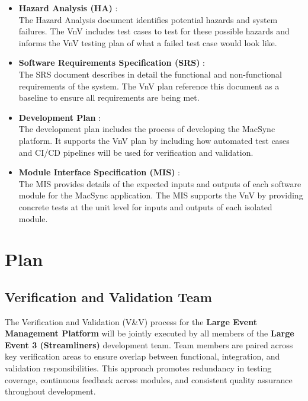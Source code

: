 \documentclass[12pt, titlepage]{article}
\begin{document}
\begin{itemize}
    \item \textbf{Hazard Analysis (HA)} \citet{SL-HA}:\\
    The Hazard Analysis document identifies potential hazards and system failures. The VnV includes test cases to test for these possible hazards and informs the VnV testing plan of what a failed test case would look like.
    \item \textbf{Software Requirements Specification (SRS)} \citet{SL-SRS}:  \\
    The SRS document describes in detail the functional and non-functional requirements of the system. The VnV plan reference this document as a baseline to ensure all requirements are being met.
    \item \textbf{Development Plan} \citet{SL-DEVPLAN}:\\
    The development plan includes the process of developing the MacSync platform. It supports the VnV plan by including how automated test cases and CI/CD pipelines will be used for verification and validation.
    \item \textbf{Module Interface Specification (MIS) } \citet{SL-MIS}:\\
    The MIS provides details of the expected inputs and outputs of each software module for the MacSync application. The MIS supports the VnV by providing concrete tests at the unit level for inputs and outputs of each isolated module.
\end{itemize}

\section{Plan}


\subsection{Verification and Validation Team}

The Verification and Validation (V\&V) process for the \textbf{Large Event Management Platform} will be jointly executed by all members of the \textbf{Large Event 3 (Streamliners)} development team. Team members are paired across key verification areas to ensure overlap between functional, integration, and validation responsibilities. This approach promotes redundancy in testing coverage, continuous feedback across modules, and consistent quality assurance throughout development.
\end{document}
